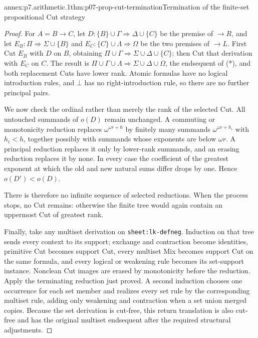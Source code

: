 \begin{annexitem}{annex:p7.arithmetic.1}{thm:p07-prop-cut-termination}{Termination of the finite-set propositional Cut strategy}
\begin{proof}
For \(A=B\to C\), let
\(D:\{B\}\cup\Gamma\Rightarrow\Delta\cup\{C\}\) be the premise of
\(\to R\), and let
\(E_B:\Pi\Rightarrow\Sigma\cup\{B\}\) and
\(E_C:\{C\}\cup\Lambda\Rightarrow\Omega\) be the two premises of
\(\to L\).  First Cut \(E_B\) with \(D\) on \(B\), obtaining
\(\Pi\cup\Gamma\Rightarrow\Sigma\cup\Delta\cup\{C\}\); then Cut that
derivation with \(E_C\) on \(C\).  The result is
\(\Pi\cup\Gamma\cup\Lambda\Rightarrow\Sigma\cup\Delta\cup\Omega\), the
endsequent of (*), and both replacement Cuts have lower rank.  Atomic formulas have no
logical introduction rules, and \(\bot\) has no right-introduction rule, so
there are no further principal pairs.

We now check the ordinal rather than merely the rank of the selected Cut.
All untouched summands of \(o(D)\) remain unchanged.  A commuting or
monotonicity reduction replaces
\(\omega^{\omega r+h}\) by finitely many summands
\(\omega^{\omega r+h_i}\) with \(h_i<h\), together possibly with summands
whose exponents are below \(\omega r\).  A principal reduction replaces it
only by lower-rank summands, and an erasing reduction replaces it by none.
In every case the coefficient of the greatest exponent at which the old and
new natural sums differ drops by one.  Hence \(o(D')<o(D)\).

There is therefore no infinite sequence of selected reductions.  When the
process stops, no Cut remains: otherwise the finite tree would again contain
an uppermost Cut of greatest rank.

Finally, take any multiset derivation on \texttt{sheet:lk-defneg}.  Induction
on that tree sends every context to its support; exchange and contraction
become identities, primitive Cut becomes support Cut, every multiset Mix
becomes support Cut on the same formula, and every logical or weakening rule
becomes its set-support instance.  Nonclean Cut images are erased by
monotonicity before the reduction.
Apply the terminating reduction just proved.  A second induction chooses one
occurrence for each set member and realizes every set rule by the corresponding
multiset rule, adding only weakening and contraction when a set union merged
copies.  Because the set derivation is cut-free, this return translation is
also cut-free and has the original multiset endsequent after the required
structural adjustments.
\end{proof}
\end{annexitem}
